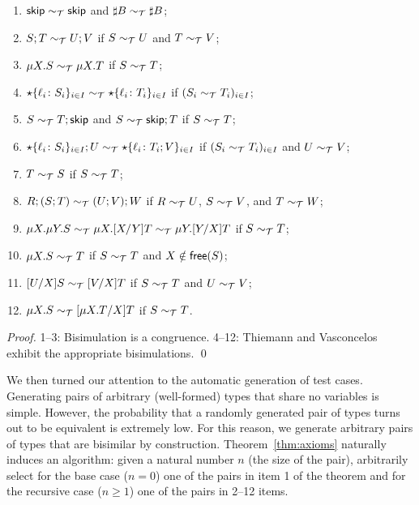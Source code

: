\begin{theorem}
\label{thm:axioms}
  \begin{enumerate}
  \item $\mathsf{skip} \sim_\mathcal T \mathsf{skip}$ and $\sharp B \sim_\mathcal T \sharp B$;
  \item $S;T \sim_\mathcal T U;V$ if $S \sim_\mathcal T U$ and $T \sim_\mathcal T V$;
  \item $\mu X.S \sim_\mathcal T \mu X.T$ if $S \sim_\mathcal T T$;
  \item $\star\{\ell_i\colon S_i\}_{i\in I}\sim_\mathcal T
    \star\{\ell_i\colon T_i\}_{i\in I}$ if $(S_i \sim_\mathcal T T_i)_{i\in
      I}$;
  \item $S\sim_\mathcal T T;\mathsf{skip}$ and $S\sim_\mathcal T \mathsf{skip};T$ if $S \sim_\mathcal T T$;
  \item $\star\{\ell_i\colon S_i\}_{i\in I};U\sim_\mathcal T
    \star\{\ell_i\colon T_i;V\}_{i\in I}$ if $(S_i \sim_\mathcal T T_i)_{i\in
      I}$ and $U \sim_\mathcal T V$;
  \item $T \sim_\mathcal T S$ if $S \sim_\mathcal T T$;
  \item $R;(S;T) \sim_\mathcal T (U;V);W$ if $R \sim_\mathcal T U$, $S \sim_\mathcal T V$, and $T\sim_\mathcal T W$;
  \item
    $\mu X.\mu Y.S \sim_\mathcal T \mu X.[{X}/{Y}]T \sim_\mathcal T \mu Y.[{Y}/{X}]T$ if $S \sim_\mathcal T T$;
  \item $\mu X.S \sim_\mathcal T T$ if $S \sim_\mathcal T T$ and $X\notin\mathsf{free}(S)$;
  \item $[{U}/{X}]S\sim_\mathcal T [{V}/{X}]T$  if $S \sim_\mathcal T T$ and $U \sim_\mathcal T V$;
  \item $\mu X.S \sim_\mathcal T [{\mu X.T}/{X}]T$ if $S \sim_\mathcal T T$.
  \end{enumerate}
\end{theorem}
%
\begin{proof}
  1--3: Bisimulation is a congruence. 4--12: Thiemann and
  Vasconcelos~\cite{thiemann2016context} exhibit the appropriate
  bisimulations. \qed
\end{proof}

We then turned our attention to the automatic generation of test
cases. Generating pairs of arbitrary (well-formed) types that share no
variables is simple. 
However,
the probability that a randomly generated pair of types
turns out to be equivalent is extremely low. For this reason, we
generate arbitrary pairs of types that are bisimilar by
construction. Theorem~\ref{thm:axioms} naturally induces an algorithm:
given a natural number $n$ (the size of the pair), arbitrarily select
for the base case ($n=0$) one of the pairs in item 1 of the theorem
and for the recursive case ($n\ge1$) one of the pairs in 2--12 items.


